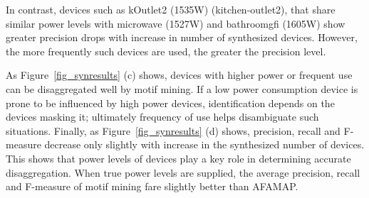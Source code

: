 In contrast,
devices such as
kOutlet2 (1535W) (kitchen-outlet2),
that share similar power levels with microwave (1527W) and
bathroomgfi (1605W) show greater precision drops with increase
in number of synthesized devices. However, the more frequently such
devices are used, the greater the precision level.

As Figure~\ref{fig_synresults} (c) shows,
devices with higher power or frequent use
can be disaggregated
well by motif mining. If a low power consumption device is prone
to be influenced by high power devices, identification depends on the devices
masking it; ultimately frequency of use helps disambiguate such situations.
Finally, as
Figure~\ref{fig_synresults} (d) shows,
precision, recall and F-measure decrease only slightly with increase in
the synthesized number of devices. This shows that power levels of devices play
a key role in determining accurate disaggregation.
When true power levels are supplied, the average precision, recall and F-measure of motif mining
fare slightly better than AFAMAP.

